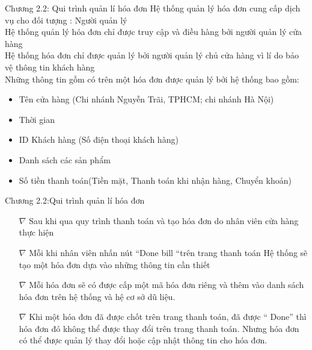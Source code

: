 \documentclass{beamer}
\begin{document}
\begin{frame}{Chương 2.2: Qui trình quản lí hóa đơn}
    Hệ thống quản lý hóa đơn cung cấp dịch vụ cho đối tượng : Người quản lý\\
    Hệ thống quản lý hóa đơn chỉ được truy cập và điều hàng bởi người quản lý cửa hàng\\
    Hệ thống hóa đơn chỉ được quản lý bởi người quản lý chủ cửa hàng  vì lí do bảo vệ thông tin khách hàng\\
    
    Những thông tin gồm có trên một hóa đơn được quản lý bởi hệ thống bao gồm:
    \begin{itemize}
        \item Tên cửa hàng (Chi nhánh Nguyễn Trãi, TPHCM; chi nhánh Hà Nội)
        \item Thời gian
        \item ID Khách hàng (Số điện thoại khách hàng)
        \item Danh sách các sản phẩm
        \item Số tiền thanh toán(Tiền mặt, Thanh toán khi nhận hàng, Chuyển khoản)
    \end{itemize}
\end{frame}
\begin{frame}{Chương 2.2:Qui trình quản lí hóa đơn}
    \begin{itemize}
        \item[$\nabla$]Sau khi qua quy trình thanh toán và tạo hóa đơn do nhân viên cửa hàng thực hiện\\
        \item[$\nabla$]Mỗi khi nhân viên nhấn nút  “Done bill  “trên trang thanh toán Hệ thống sẽ tạo một hóa đơn dựa vào những thông tin cần thiết\\
        \item[$\nabla$]Mỗi hóa đơn sẽ có được cấp một mã hóa đơn riêng và thêm vào danh sách hóa đơn trên hệ thống và hệ cơ sở dũ liệu. \\
        \item[$\nabla$]Khi một hóa đơn đã được chốt trên trang thanh toán, đã được “ Done” thì hóa đơn đó không thể được thay đổi trên trang thanh toán. Nhưng hóa đơn có thể được quản lý thay đổi hoặc cập nhật thông tin cho hóa đơn.\\
    \end{itemize}
\end{frame}
\end{document}
